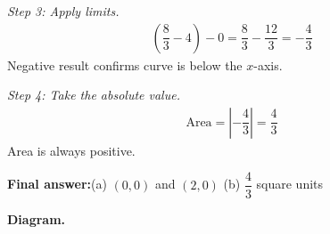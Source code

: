 \documentclass[11pt]{article}
\begin{document}
\textit{Step 3: Apply limits.}
\[\begin{gathered}
\left(\dfrac{8}{3} - 4\right) - 0 = \dfrac{8}{3} - \dfrac{12}{3} = -\dfrac{4}{3}
\end{gathered}\]
Negative result confirms curve is below the \( x \)-axis.

\textit{Step 4: Take the absolute value.}
\[\begin{gathered}
\text{Area} = \left|-\dfrac{4}{3}\right| = \dfrac{4}{3}
\end{gathered}\]
Area is always positive.

\begin{answerbox}
\textbf{Final answer:}\quad (a) \(\displaystyle (0,0)\) and \(\displaystyle (2,0)\)   (b) \(\displaystyle \dfrac{4}{3}\) square units
\end{answerbox}
\textbf{Diagram.}
\end{document}
